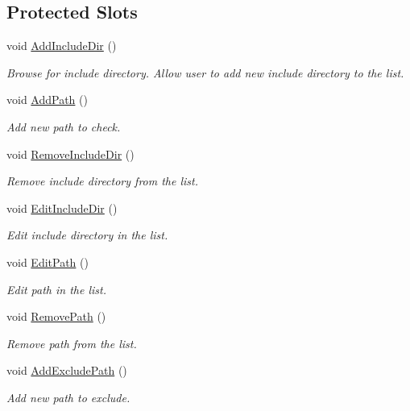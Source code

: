 \subsection*{Protected Slots}
\begin{DoxyCompactItemize}
\item 
void \hyperlink{class_project_file_dialog_aef8ccf50be530f78b4e1799fd14d1026}{Add\-Include\-Dir} ()
\begin{DoxyCompactList}\small\item\em Browse for include directory. Allow user to add new include directory to the list. \end{DoxyCompactList}\item 
void \hyperlink{class_project_file_dialog_ad2648ec1723d3faf94c7a7e9779f6396}{Add\-Path} ()
\begin{DoxyCompactList}\small\item\em Add new path to check. \end{DoxyCompactList}\item 
void \hyperlink{class_project_file_dialog_ad7db4aeaa34b91c48970af15101c363c}{Remove\-Include\-Dir} ()
\begin{DoxyCompactList}\small\item\em Remove include directory from the list. \end{DoxyCompactList}\item 
void \hyperlink{class_project_file_dialog_a37305852e940706edc685ebc4a4b588b}{Edit\-Include\-Dir} ()
\begin{DoxyCompactList}\small\item\em Edit include directory in the list. \end{DoxyCompactList}\item 
void \hyperlink{class_project_file_dialog_a917a055a8da9b2843bf0138fbf3722a7}{Edit\-Path} ()
\begin{DoxyCompactList}\small\item\em Edit path in the list. \end{DoxyCompactList}\item 
void \hyperlink{class_project_file_dialog_a69988c747baee692fc07fa63a7464a17}{Remove\-Path} ()
\begin{DoxyCompactList}\small\item\em Remove path from the list. \end{DoxyCompactList}\item 
void \hyperlink{class_project_file_dialog_af23fd6fbd0b34d89fef674c2a929790c}{Add\-Exclude\-Path} ()
\begin{DoxyCompactList}\small\item\em Add new path to exclude. \end{DoxyCompactList}\item 

\end{DoxyCompactItemize}
